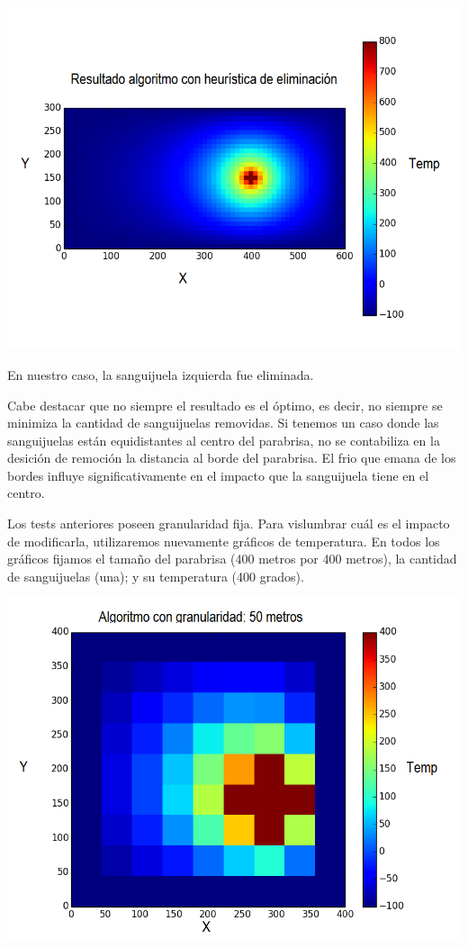	\begin{center}
		\includegraphics[scale=0.5]{./img/test6_conkill.png}
	\end{center}

	En nuestro caso, la sanguijuela izquierda fue eliminada.

	Cabe destacar que no siempre el resultado es el óptimo, es decir, no siempre se minimiza la cantidad de sanguijuelas removidas. Si tenemos un caso donde las sanguijuelas están equidistantes al centro del parabrisa, no se contabiliza en la desición de remoción la distancia al borde del parabrisa. El frio que emana de los bordes influye significativamente en el impacto que la sanguijuela tiene en el centro.

	Los tests anteriores poseen granularidad fija. Para vislumbrar cuál es el impacto de modificarla, utilizaremos nuevamente gráficos de temperatura. En todos los gráficos fijamos el tamaño del parabrisa (400 metros por 400 metros), la cantidad de sanguijuelas (una); y su temperatura (400 grados).

	\begin{center}
		\includegraphics[scale=0.5]{./img/granularidad/g50_t400_sinkill.png}
	\end{center}

